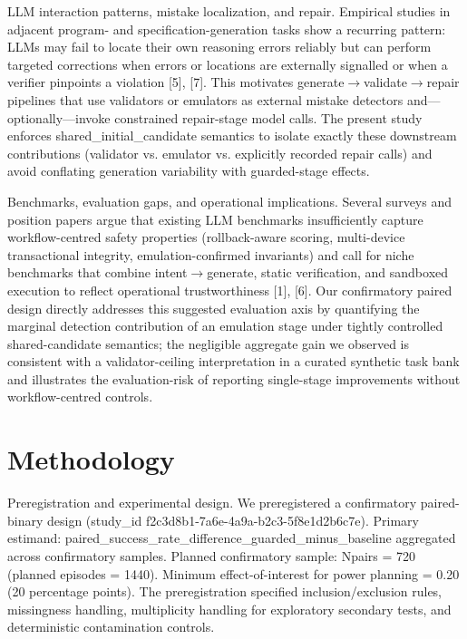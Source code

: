\documentclass[conference]{IEEEtran}
\begin{document}
LLM interaction patterns, mistake localization, and repair. Empirical studies in adjacent program- and specification-generation tasks show a recurring pattern: LLMs may fail to locate their own reasoning errors reliably but can perform targeted corrections when errors or locations are externally signalled or when a verifier pinpoints a violation [5], [7]. This motivates generate\ensuremath{\rightarrow}validate\ensuremath{\rightarrow}repair pipelines that use validators or emulators as external mistake detectors and---optionally---invoke constrained repair-stage model calls. The present study enforces shared\_initial\_candidate semantics to isolate exactly these downstream contributions (validator vs. emulator vs. explicitly recorded repair calls) and avoid conflating generation variability with guarded-stage effects.

Benchmarks, evaluation gaps, and operational implications. Several surveys and position papers argue that existing LLM benchmarks insufficiently capture workflow-centred safety properties (rollback-aware scoring, multi-device transactional integrity, emulation-confirmed invariants) and call for niche benchmarks that combine intent\ensuremath{\rightarrow}generate, static verification, and sandboxed execution to reflect operational trustworthiness [1], [6]. Our confirmatory paired design directly addresses this suggested evaluation axis by quantifying the marginal detection contribution of an emulation stage under tightly controlled shared-candidate semantics; the negligible aggregate gain we observed is consistent with a validator-ceiling interpretation in a curated synthetic task bank and illustrates the evaluation-risk of reporting single-stage improvements without workflow-centred controls.

\section{Methodology}
Preregistration and experimental design. We preregistered a confirmatory paired-binary design (study\_id f2c3d8b1-7a6e-4a9a-b2c3-5f8e1d2b6c7e). Primary estimand: paired\_success\_rate\_difference\_guarded\_minus\_baseline aggregated across confirmatory samples. Planned confirmatory sample: Npairs = 720 (planned episodes = 1440). Minimum effect-of-interest for power planning = 0.20 (20 percentage points). The preregistration specified inclusion/exclusion rules, missingness handling, multiplicity handling for exploratory secondary tests, and deterministic contamination controls.
\end{document}
